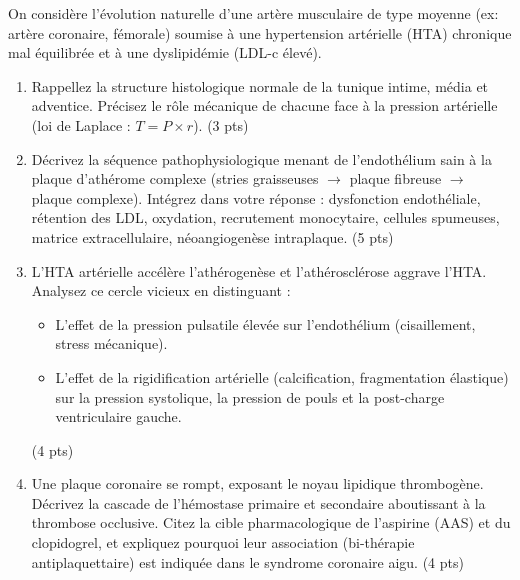 \documentclass[11pt]{article}
\begin{document}
\begin{exercice}
On considère l'évolution naturelle d'une artère musculaire de type moyenne (ex: artère coronaire, fémorale) soumise à une hypertension artérielle (HTA) chronique mal équilibrée et à une dyslipidémie (LDL-c élevé).
\begin{enumerate}
    \item Rappellez la structure histologique normale de la tunique intime, média et adventice. Précisez le rôle mécanique de chacune face à la pression artérielle (loi de Laplace : $T = P \times r$). (3 pts)
    \item Décrivez la séquence pathophysiologique menant de l'endothélium sain à la plaque d'athérome complexe (stries graisseuses $\to$ plaque fibreuse $\to$ plaque complexe). Intégrez dans votre réponse : dysfonction endothéliale, rétention des LDL, oxydation, recrutement monocytaire, cellules spumeuses, matrice extracellulaire, néoangiogenèse intraplaque. (5 pts)
    \item L'HTA artérielle accélère l'athérogenèse et l'athérosclérose aggrave l'HTA. Analysez ce cercle vicieux en distinguant :
    \begin{itemize}
        \item L'effet de la pression pulsatile élevée sur l'endothélium (cisaillement, stress mécanique).
        \item L'effet de la rigidification artérielle (calcification, fragmentation élastique) sur la pression systolique, la pression de pouls et la post-charge ventriculaire gauche.
    \end{itemize}
    (4 pts)
    \item Une plaque coronaire se rompt, exposant le noyau lipidique thrombogène. Décrivez la cascade de l'hémostase primaire et secondaire aboutissant à la thrombose occlusive. Citez la cible pharmacologique de l'aspirine (AAS) et du clopidogrel, et expliquez pourquoi leur association (bi-thérapie antiplaquettaire) est indiquée dans le syndrome coronaire aigu. (4 pts)
\end{enumerate}
\end{exercice}
\end{document}

